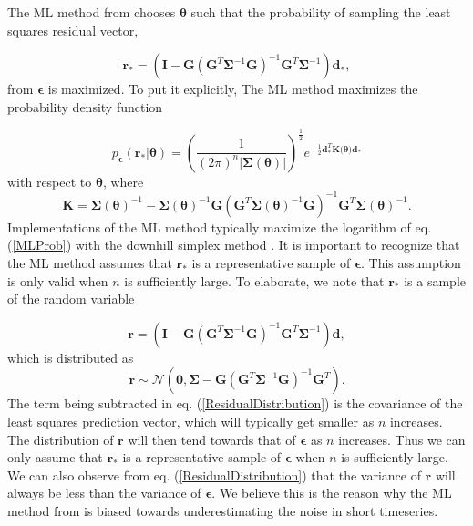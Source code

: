 \documentclass[10pt,a4paper]{article}
\begin{document}
The ML method from \citet{Langbein1997} chooses $\mathbf{\theta}$ such that the probability of sampling the least squares residual vector,

\begin{equation}\label{ResidualRealization}
  \mathbf{r}_* =  \left(\mathbf{I} - \mathbf{G}\left(\mathbf{G}^T\mathbf{\Sigma}^{-1}\mathbf{G}\right)^{-1}\mathbf{G}^T\mathbf{\Sigma}^{-1}\right)\mathbf{d_*},
\end{equation}  
from $\mathbf{\epsilon}$ is maximized. To put it explicitly, The ML method maximizes the probability density function

\begin{equation}\label{MLProb}
p_\mathbf{\epsilon}(\mathbf{r}_*|\mathbf{\theta}) = 
\left(\frac{1}{(2\pi)^n\left| \mathbf{\Sigma}(\mathbf{\theta}) \right|}\right)^{\frac{1}{2}} 
e^{-\tfrac{1}{2}\mathbf{d}_*^T\mathbf{K(\mathbf{\theta}})\mathbf{d}_*}
\end{equation}
with respect to $\mathbf{\theta}$, where
\begin{equation}
\mathbf{K} = \mathbf{\Sigma}(\mathbf{\theta})^{-1} - 
             \mathbf{\Sigma}(\mathbf{\theta})^{-1}\mathbf{G}
             \left(\mathbf{G}^T\mathbf{\Sigma}(\mathbf{\theta})^{-1}\mathbf{G}\right)^{-1}
             \mathbf{G}^T\mathbf{\Sigma}(\mathbf{\theta})^{-1}.
\end{equation}
Implementations of the ML method typically maximize the logarithm of eq. (\ref{MLProb}) with the downhill simplex method \citep{Press2007}. It is important to recognize that the ML method assumes that $\mathbf{r}_*$ is a representative sample of $\mathbf{\epsilon}$. This assumption is only valid when $n$ is sufficiently large. To elaborate, we note that $\mathbf{r_*}$ is a sample of the random variable

\begin{equation}\label{ResidualVariable}
  \mathbf{r} =  \left(\mathbf{I} - \mathbf{G}\left(\mathbf{G}^T\mathbf{\Sigma}^{-1}\mathbf{G}\right)^{-1}\mathbf{G}^T\mathbf{\Sigma}^{-1}\right)\mathbf{d},
\end{equation}  
which is distributed as
\begin{equation}\label{ResidualDistribution}
  \mathbf{r} \sim \mathcal{N}\left(\mathbf{0},\mathbf{\Sigma} - \mathbf{G}\left(\mathbf{G}^T\mathbf{\Sigma}^{-1}\mathbf{G}\right)^{-1}\mathbf{G}^T\right).
\end{equation}
The term being subtracted in eq. (\ref{ResidualDistribution}) is the covariance of the least squares prediction vector, which will typically get smaller as $n$ increases. The distribution of $\mathbf{r}$ will then tend towards that of $\mathbf{\epsilon}$ as $n$ increases. Thus we can only assume that $\mathbf{r}_*$ is a representative sample of $\mathbf{\epsilon}$ when $n$ is sufficiently large. We can also observe from eq. (\ref{ResidualDistribution}) that the variance of $\mathbf{r}$ will always be less than the variance of $\mathbf{\epsilon}$.  We believe this is the reason why the ML method from \citet{Langbein1997} is biased towards underestimating the noise in short timeseries.
\end{document}
